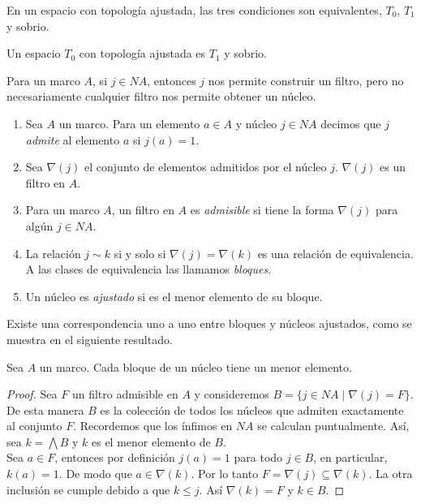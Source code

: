 \begin{lem}
    En un espacio con topología ajustada, las tres condiciones son equivalentes, $T_0$, $T_1$ y sobrio.
\end{lem}

\begin{cor}
    Un espacio $T_0$ con topología ajustada es $T_1$ y sobrio.
\end{cor}

Para un marco $A$, si $j\in NA$, entonces $j$ nos permite construir un filtro, pero no necesariamente cualquier filtro nos permite obtener un núcleo.

\begin{dfn}\label{Filtroadmisible}
    \begin{enumerate}
        \item Sea $A$ un marco. Para un elemento $a\in A$ y núcleo $j\in NA$ decimos que $j$ \emph{admite} al elemento $a$ si $j(a)=1$.

        \item Sea $\nabla (j)$ el conjunto de elementos admitidos por el núcleo $j$. $\nabla(j)$ es un filtro en $A$.

        \item Para un marco $A$, un filtro en $A$ es \emph{admisible} si tiene la forma $\nabla(j)$ para algún $j\in NA$.

        \item La relación $j\sim k$ si y solo si $\nabla(j)=\nabla(k)$ es una relación de equivalencia. A las clases de equivalencia las llamamos \emph{bloques}.

        \item Un núcleo es \emph{ajustado} si es el menor elemento de su bloque.
    \end{enumerate}
\end{dfn}

Existe una correspondencia uno a uno entre bloques y núcleos ajustados, como se muestra en el siguiente resultado.

\begin{lem}\label{Menorelemento}
    Sea $A$ un marco. Cada bloque de un núcleo tiene un menor elemento.
\end{lem}

\begin{proof}
    Sea $F$ un filtro admisible en $A$ y consideremos $B=\{j\in NA\mid \nabla(j)=F\}$. De esta manera $B$ es la colección de todos los núcleos que admiten exactamente al conjunto $F$. Recordemos que los ínfimos en $NA$ se calculan puntualmente. Así, sea $k=\bigwedge B$ y $k$ es el menor elemento de $B$.\\

    Sea $a\in F$, entonces por definición $j(a)=1$ para todo $j\in B$, en particular, $k(a)=1$. De modo que $a\in \nabla(k)$. Por lo tanto $F=\nabla(j)\subseteq \nabla(k)$. La otra inclusión se cumple debido a que $k\leq j$. Así $\nabla(k)=F$ y $k\in B$.
\end{proof}

